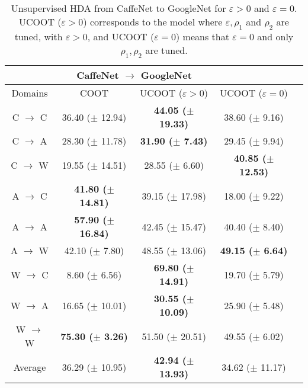 \hfill
\begin{table}[h]
	\begin{center}
		\begin{small}
			\begin{sc}
				\begin{tabular}{c c c c c}
					\toprule
					& \multicolumn{2}{c}{CaffeNet $\to$ GoogleNet} \\
					\midrule
					Domains & COOT & UCOOT ($\varepsilon > 0$) & UCOOT ($\varepsilon = 0$) \\
					\midrule

					C $\to$ C & 36.40 ($\pm$ 12.94) & \textbf{44.05 ($\pm$ 19.33)} & 38.60 ($\pm$ 9.16) \\
					\hline
					C $\to$ A & 28.30 ($\pm$ 11.78) & \textbf{31.90 ($\pm$ 7.43)} & 29.45 ($\pm$ 9.94) \\
					\hline
					C $\to$ W & 19.55 ($\pm$ 14.51) & 28.55 ($\pm$ 6.60) & \textbf{40.85 ($\pm$ 12.53)} \\
					\hline

					A $\to$ C & \textbf{41.80 ($\pm$ 14.81)} & 39.15 ($\pm$ 17.98) & 18.00 ($\pm$ 9.22) \\
					\hline
					A $\to$ A & \textbf{57.90 ($\pm$ 16.84)} & 42.45 ($\pm$ 15.47) & 40.40 ($\pm$ 8.40) \\
					\hline
					A $\to$ W & 42.10 ($\pm$ 7.80) & 48.55 ($\pm$ 13.06) & \textbf{49.15 ($\pm$ 6.64)} \\
					\hline

					W $\to$ C & 8.60 ($\pm$ 6.56) & \textbf{69.80 ($\pm$ 14.91)} & 19.70 ($\pm$ 5.79) \\
					\hline
					W $\to$ A & 16.65 ($\pm$ 10.01) & \textbf{30.55 ($\pm$ 10.09)} & 25.90 ($\pm$ 5.48) \\
					\hline
					W $\to$ W & \textbf{75.30 ($\pm$ 3.26)} & 51.50 ($\pm$ 20.51) & 49.55 ($\pm$ 6.02) \\
					\bottomrule
					Average & 36.29 ($\pm$ 10.95) & \textbf{42.94 ($\pm$ 13.93)} & 34.62 ($\pm$ 11.17) \\
					\bottomrule

				\end{tabular}
			\end{sc}
		\end{small}
	\end{center}
	\caption{Unsupervised HDA from CaffeNet to GoogleNet for $\varepsilon > 0$ and $\varepsilon = 0$.
  UCOOT ($\varepsilon > 0$) corresponds to the model where $\varepsilon, \rho_1$ and $\rho_2$
  are tuned, with $\varepsilon > 0$, and UCOOT ($\varepsilon = 0$) means that $\varepsilon = 0$
  and only $\rho_1, \rho_2$ are tuned. }
	\label{tab:hda2}
\end{table}

